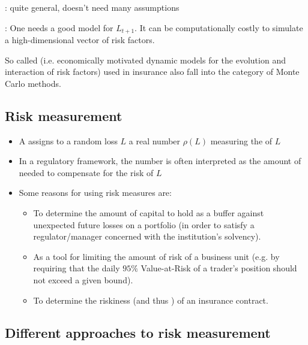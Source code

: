 : quite general, doesn't need many assumptions

:  One needs a good model for $L_{t+1}$.  It can be computationally costly to simulate a high-dimensional vector of risk factors.

So called  (i.e. economically motivated dynamic models for the evolution and interaction of risk factors) used in insurance also fall into the category of Monte Carlo methods.






\subsection*{Risk measurement}
\begin{itemize}[leftmargin=*]
    \item A  assigns to a random loss $L$ a real number $\rho(L)$ measuring the  of $L$
    \item In a regulatory framework, the number is often interpreted as the amount of  needed to compensate for the risk of $L$
    \item Some reasons for using risk measures are:
    \begin{itemize}[leftmargin=*]
    \item To determine the amount of capital to hold as a buffer against unexpected future losses on a portfolio (in order to satisfy a regulator/manager concerned with the institution's solvency).
    \item As a tool for limiting the amount of risk of a business unit (e.g. by requiring that the daily $95 \%$ Value-at-Risk of a trader's position should not exceed a given bound).
    \item To determine the riskiness (and thus ) of an insurance contract.
    \end{itemize}
\end{itemize}





\subsection*{Different approaches to risk measurement}
